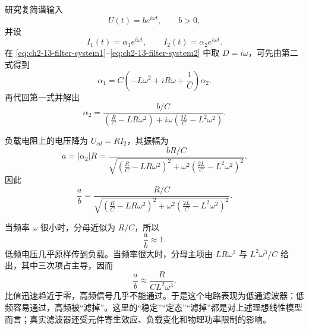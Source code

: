 研究复简谐输入
\begin{equation}
 U(t)=be^{i\omega t},
 \qquad b>0,
 \label{eq:ch2-13-filter-input}
\end{equation}
并设
\begin{equation}
 I_1(t)=\alpha_1e^{i\omega t},
 \qquad
 I_2(t)=\alpha_2e^{i\omega t}.
 \label{eq:ch2-13-filter-complex-currents}
\end{equation}
在 \eqref{eq:ch2-13-filter-system1}--\eqref{eq:ch2-13-filter-system2} 中取 \(D=i\omega\)，可先由第二式得到
\begin{equation}
 \alpha_1
 =C\left(-L\omega^2+iR\omega+\frac1C\right)\alpha_2.
 \label{eq:ch2-13-filter-alpha1}
\end{equation}
再代回第一式并解出
\begin{equation}
 \alpha_2=
 \frac{b/C}
 {\left(\frac RC-LR\omega^2\right)
  +i\omega\left(\frac{2L}{C}-L^2\omega^2\right)}.
 \label{eq:ch2-13-filter-alpha2}
\end{equation}

负载电阻上的电压降为 \(U_{cd}=RI_2\)，其振幅为
\begin{equation}
 a=|\alpha_2|R
 =\frac{bR/C}
 {\sqrt{\left(\frac RC-LR\omega^2\right)^2
 +\omega^2\left(\frac{2L}{C}-L^2\omega^2\right)^2}}.
 \label{eq:ch2-13-filter-output-amplitude}
\end{equation}
因此
\begin{equation}
 \frac ab
 =\frac{R/C}
 {\sqrt{\left(\frac RC-LR\omega^2\right)^2
 +\omega^2\left(\frac{2L}{C}-L^2\omega^2\right)^2}}.
 \label{eq:ch2-13-filter-transfer}
\end{equation}

当频率 \(\omega\) 很小时，分母近似为 \(R/C\)，所以
\[
 \frac ab\approx1.
\]
低频电压几乎原样传到负载。当频率很大时，分母主项由
\(LR\omega^2\) 与 \(L^2\omega^3/C\) 给出，其中三次项占主导，因而
\begin{equation}
 \frac ab\approx\frac{R}{CL^2\omega^3}.
 \label{eq:ch2-13-filter-high-frequency}
\end{equation}
比值迅速趋近于零，高频信号几乎不能通过。于是这个电路表现为低通滤波器：低频容易通过，高频被“滤掉”。这里的“稳定”“定态”“滤掉”都是对上述理想线性模型而言；真实滤波器还受元件寄生效应、负载变化和物理功率限制的影响。
